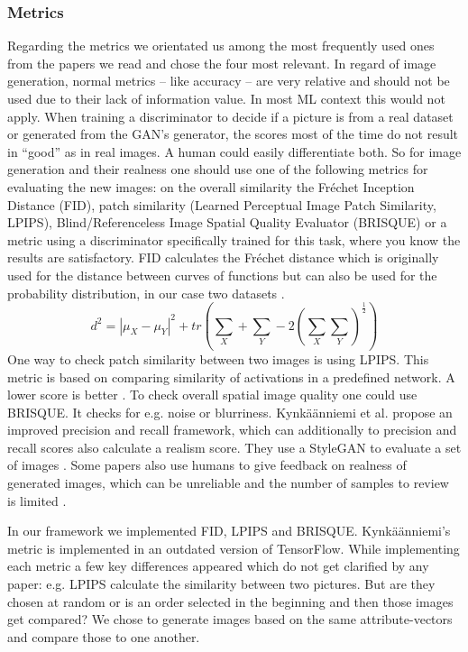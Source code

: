 \documentclass[12pt, a4paper]{article}
\begin{document}
\subsubsection{Metrics}\label{metrics}
Regarding the metrics we orientated us among the most frequently used ones from the papers we read and chose the four most relevant. 
In regard of image generation, normal metrics -- like accuracy -- are very relative and should not be used due to their lack of information value. In most ML context this would not apply. When training a discriminator to decide if a picture is from a real dataset or generated from the GAN's generator, the scores most of the time do not result in ``good'' as in real images. A human could easily differentiate both.
So for image generation and their realness one should use one of the following metrics for evaluating the new images: on the overall similarity the Fréchet Inception Distance (FID), patch similarity (Learned Perceptual Image Patch Similarity, LPIPS), Blind/Referenceless Image Spatial Quality Evaluator (BRISQUE) or a metric using a discriminator specifically trained for this task, where you know the results are satisfactory.
FID calculates the Fréchet distance which is originally used for the distance between curves of functions but can also be used for the probability distribution, in our case two datasets \cite{NIPS2017_8a1d6947}. $$d^2 = |\mu_X - \mu_Y|^2 + tr(\sum_X + \sum_Y - 2 (\sum_X \sum_Y)^{\frac{1}{2}})$$
One way to check patch similarity between two images is using LPIPS. This metric is based on comparing similarity of activations in a predefined network. A lower score is better \cite{DBLP}. 
To check overall spatial image quality one could use BRISQUE. It checks for e.g. noise or blurriness. 
Kynkäänniemi et al. propose an improved precision and recall framework, which can additionally to precision and recall scores also calculate a realism score. They use a StyleGAN to evaluate a set of images \cite{NEURIPS2019_0234c510}.
Some papers also use humans to give feedback on realness of generated images, which can be unreliable and the number of samples to review is limited \cite{Xia_2021_CVPR}.

In our framework we implemented FID, LPIPS and BRISQUE. Kyn\-kään\-niemi's metric is implemented in an outdated version of TensorFlow. 
While implementing each metric a few key differences appeared which do not get clarified by any paper: e.g. LPIPS calculate the similarity between two pictures. 
But are they chosen at random or is an order selected in the beginning and then those images get compared? We chose to generate images based on the same attribute-vectors and compare those to one another.
\end{document}
